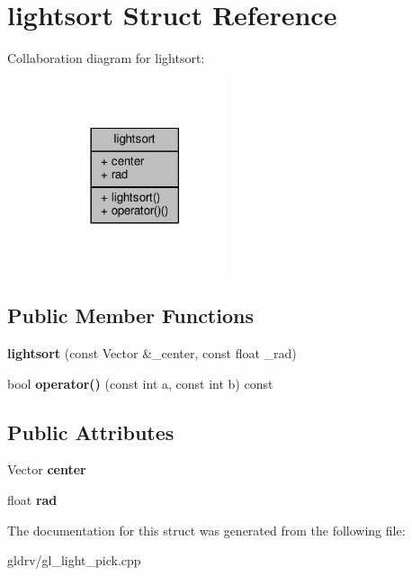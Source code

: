 \hypertarget{structlightsort}{}\section{lightsort Struct Reference}
\label{structlightsort}


Collaboration diagram for lightsort\+:
\nopagebreak
\begin{figure}[H]
\begin{center}
\leavevmode
\includegraphics[width=153pt]{db/dad/structlightsort__coll__graph}
\end{center}
\end{figure}
\subsection*{Public Member Functions}
\begin{DoxyCompactItemize}
\item 
{\bfseries lightsort} (const Vector \&\+\_\+center, const float \+\_\+rad)\hypertarget{structlightsort_aa505d0fb201d403c28ab0556a5004428}{}\label{structlightsort_aa505d0fb201d403c28ab0556a5004428}

\item 
bool {\bfseries operator()} (const int a, const int b) const \hypertarget{structlightsort_abf1ea7061f14e1a29fc8c8f7288a020d}{}\label{structlightsort_abf1ea7061f14e1a29fc8c8f7288a020d}

\end{DoxyCompactItemize}
\subsection*{Public Attributes}
\begin{DoxyCompactItemize}
\item 
Vector {\bfseries center}\hypertarget{structlightsort_a366148c1f063609ccf5fe7d7a52399d9}{}\label{structlightsort_a366148c1f063609ccf5fe7d7a52399d9}

\item 
float {\bfseries rad}\hypertarget{structlightsort_a46b76c9f496086f7abee4a2bd629258f}{}\label{structlightsort_a46b76c9f496086f7abee4a2bd629258f}

\end{DoxyCompactItemize}


The documentation for this struct was generated from the following file\+:\begin{DoxyCompactItemize}
\item 
gldrv/gl\+\_\+light\+\_\+pick.\+cpp\end{DoxyCompactItemize}
